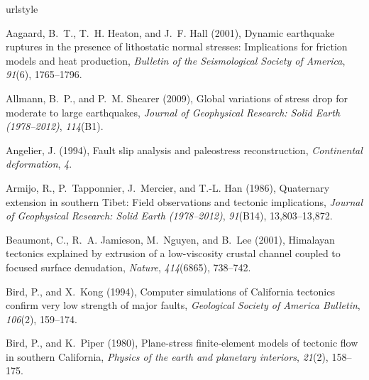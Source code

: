 \documentclass[draft,jgrga]{AGUTeX}
\begin{document}
\begin{article}
\begin{thebibliography}{90}
\providecommand{\natexlab}[1]{#1}
\expandafter\ifx\csname urlstyle\endcsname\relax
  \providecommand{\doi}[1]{doi:\discretionary{}{}{}#1}\else
  \providecommand{\doi}{doi:\discretionary{}{}{}\begingroup
  \urlstyle{rm}\Url}\fi

Aagaard, B.~T., T.~H. Heaton, and J.~F. Hall (2001), Dynamic earthquake
  ruptures in the presence of lithostatic normal stresses: {I}mplications for
  friction models and heat production, \textit{Bulletin of the Seismological
  Society of America}, \textit{91}(6), 1765--1796.

Allmann, B.~P., and P.~M. Shearer (2009), Global variations of stress drop for
  moderate to large earthquakes, \textit{Journal of Geophysical Research: Solid
  Earth (1978--2012)}, \textit{114}(B1).

Angelier, J. (1994), Fault slip analysis and paleostress reconstruction,
  \textit{Continental deformation}, \textit{4}.

Armijo, R., P.~Tapponnier, J.~Mercier, and T.-L. Han (1986), Quaternary
  extension in southern {T}ibet: {F}ield observations and tectonic
  implications, \textit{Journal of Geophysical Research: Solid Earth
  (1978--2012)}, \textit{91}(B14), 13,803--13,872.

Beaumont, C., R.~A. Jamieson, M.~Nguyen, and B.~Lee (2001), Himalayan tectonics
  explained by extrusion of a low-viscosity crustal channel coupled to focused
  surface denudation, \textit{Nature}, \textit{414}(6865), 738--742.

Bird, P., and X.~Kong (1994), Computer simulations of {C}alifornia tectonics
  confirm very low strength of major faults, \textit{Geological Society of
  America Bulletin}, \textit{106}(2), 159--174.

Bird, P., and K.~Piper (1980), Plane-stress finite-element models of tectonic
  flow in southern {C}alifornia, \textit{Physics of the earth and planetary
  interiors}, \textit{21}(2), 158--175.


\end{thebibliography}
\end{article}
\end{document}
